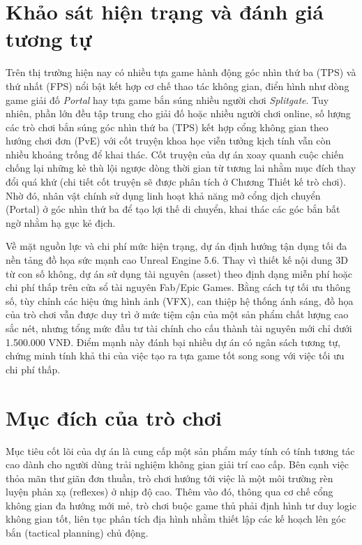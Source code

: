 \documentclass[../DoAn.tex]{subfiles}
\begin{document}
\section{Khảo sát hiện trạng và đánh giá tương tự}
\label{section:2.1}
Trên thị trường hiện nay có nhiều tựa game hành động góc nhìn thứ ba (TPS) và thứ nhất (FPS) nổi bật kết hợp cơ chế thao tác không gian, điển hình như dòng game giải đố \textit{Portal} hay tựa game bắn súng nhiều người chơi \textit{Splitgate}. Tuy nhiên, phần lớn đều tập trung cho giải đố hoặc nhiều người chơi online, số lượng các trò chơi bắn súng góc nhìn thứ ba (TPS) kết hợp cổng không gian theo hướng chơi đơn (PvE) với cốt truyện khoa học viễn tưởng kịch tính vẫn còn nhiều khoảng trống để khai thác. Cốt truyện của dự án xoay quanh cuộc chiến chống lại những kẻ thù lội ngược dòng thời gian từ tương lai nhằm mục đích thay đổi quá khứ (chi tiết cốt truyện sẽ được phân tích ở Chương Thiết kế trò chơi). Nhờ đó, nhân vật chính sử dụng linh hoạt khả năng mở cổng dịch chuyển (Portal) ở góc nhìn thứ ba để tạo lợi thế di chuyển, khai thác các góc bắn bất ngờ nhằm hạ gục kẻ địch.

Về mặt nguồn lực và chi phí mức hiện trạng, dự án định hướng tận dụng tối đa nền tảng đồ họa sức mạnh cao Unreal Engine 5.6. Thay vì thiết kế nội dung 3D từ con số không, dự án sử dụng tài nguyên (asset) theo định dạng miễn phí hoặc chi phí thấp trên cửa sổ tài nguyên Fab/Epic Games. Bằng cách tự tối ưu thông số, tùy chỉnh các hiệu ứng hình ảnh (VFX), can thiệp hệ thống ánh sáng, đồ họa của trò chơi vẫn được duy trì ở mức tiệm cận của một sản phẩm chất lượng cao sắc nét, nhưng tổng mức đầu tư tài chính cho cấu thành tài nguyên mới chỉ dưới 1.500.000 VNĐ. Điểm mạnh này đánh bại nhiều dự án có ngân sách tương tự, chứng minh tính khả thi của việc tạo ra tựa game tốt song song với việc tối ưu chi phí thấp.

\section{Mục đích của trò chơi}
\label{section:2.2}
Mục tiêu cốt lõi của dự án là cung cấp một sản phẩm máy tính có tính tương tác cao dành cho người dùng trải nghiệm không gian giải trí cao cấp. Bên cạnh việc thỏa mãn thư giãn đơn thuần, trò chơi hướng tới việc là một môi trường rèn luyện phản xạ (reflexes) ở nhịp độ cao. Thêm vào đó, thông qua cơ chế cổng không gian đa hướng mới mẻ, trò chơi buộc game thủ phải định hình tư duy logic không gian tốt, liên tục phân tích địa hình nhằm thiết lập các kế hoạch lên góc bắn (tactical planning) chủ động.
\end{document}
